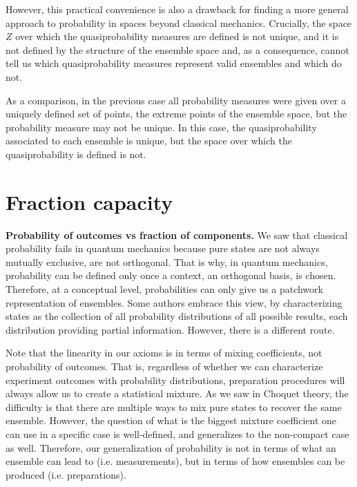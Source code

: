 \documentclass[10pt,twocolumn, nofootinbib]{revtex4-2}
\begin{document}
However, this practical convenience is also a drawback for finding a more general approach to probability in spaces beyond classical mechanics. Crucially, the space $Z$ over which the quasiprobability measures are defined is not unique, and it is not defined by the structure of the ensemble space and, as a consequence, cannot tell us which quasiprobability measures represent valid ensembles and which do not.

As a comparison, in the previous case all probability measures were given over a uniquely defined set of points, the extreme points of the ensemble space, but the probability measure may not be unique. In this case, the quasiprobability associated to each ensemble is unique, but the space over which the quasiprobability is defined is not.

\section{Fraction capacity}

\textbf{Probability of outcomes vs fraction of components.} We saw that classical probability fails in quantum mechanics because pure states are not always mutually exclusive, are not orthogonal. That is why, in quantum mechanics, probability can be defined only once a context, an orthogonal basis, is chosen. Therefore, at a conceptual level, probabilities can only give us a patchwork representation of ensembles. Some authors embrace this view, by characterizing states as the collection of all probability distributions of all possible results, each distribution providing partial information.\cite{plavala2023,wilce2025} However, there is a different route.

Note that the linearity in our axioms is in terms of mixing coefficients, not probability of outcomes. That is, regardless of whether we can characterize experiment outcomes with probability distributions, preparation procedures will always allow us to create a statistical mixture. As we saw in Choquet theory, the difficulty is that there are multiple ways to mix pure states to recover the same ensemble. However, the question of what is the biggest mixture coefficient one can use in a specific case is well-defined, and generalizes to the non-compact case as well. Therefore, our generalization of probability is not in terms of what an ensemble can lead to (i.e. measurements), but in terms of how ensembles can be produced (i.e. preparations).
\end{document}
